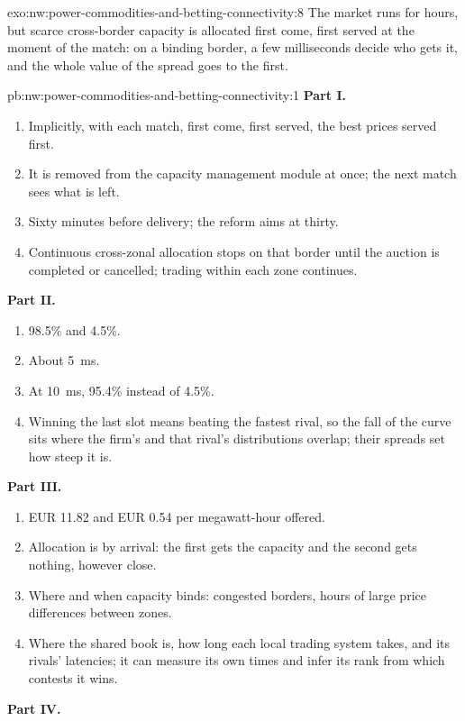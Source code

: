 \begin{solution}{exo:nw:power-commodities-and-betting-connectivity:8}
The market runs for hours, but scarce cross-border capacity is allocated first come, first served at the moment of the match: on a
binding border, a few milliseconds decide who gets it, and the whole value of the spread goes to the first.
\end{solution}

\begin{solution}{pb:nw:power-commodities-and-betting-connectivity:1}
\textbf{Part I.}
\begin{enumerate}
\item Implicitly, with each match, first come, first served, the best prices served first.
\item It is removed from the capacity management module at once; the next match sees what is left.
\item Sixty minutes before delivery; the reform aims at thirty.
\item Continuous cross-zonal allocation stops on that border until the auction is completed or cancelled; trading within each zone
  continues.
\end{enumerate}
\textbf{Part II.}
\begin{enumerate}[resume]
\item 98.5\% and 4.5\%.
\item About \qty{5}{\milli\second}.
\item At \qty{10}{\milli\second}, 95.4\% instead of 4.5\%.
\item Winning the last slot means beating the fastest rival, so the fall of the curve sits where the firm's and that rival's
  distributions overlap; their spreads set how steep it is.
\end{enumerate}
\textbf{Part III.}
\begin{enumerate}[resume]
\item EUR 11.82 and EUR 0.54 per megawatt-hour offered.
\item Allocation is by arrival: the first gets the capacity and the second gets nothing, however close.
\item Where and when capacity binds: congested borders, hours of large price differences between zones.
\item Where the shared book is, how long each local trading system takes, and its rivals' latencies; it can measure its own times and
  infer its rank from which contests it wins.
\end{enumerate}
\textbf{Part IV.}

\end{solution}
